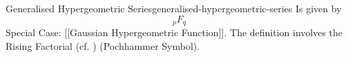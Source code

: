 \begin{definition}{Generalised Hypergeometric Series}{generalised-hypergeometric-series}
  Is given by \[_pF_q\] Special Case: {[}{[}Gaussian Hypergeometric
  Function{]}{]}. The definition involves the Rising Factorial (cf. )
  (Pochhammer Symbol).
\end{definition}
